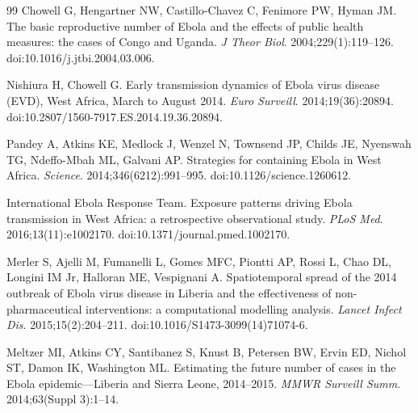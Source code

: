 \documentclass[10pt]{plos}
\begin{document}
\begin{thebibliography}{99}
 Chowell G, Hengartner NW, Castillo-Chavez C,
Fenimore PW, Hyman JM. The basic reproductive number of Ebola and the
effects of public health measures: the cases of Congo and Uganda.
\emph{J Theor Biol}. 2004;229(1):119--126. doi:10.1016/j.jtbi.2004.03.006.

 Nishiura H, Chowell G. Early transmission dynamics
of Ebola virus disease (EVD), West Africa, March to August 2014.
\emph{Euro Surveill}. 2014;19(36):20894.
doi:10.2807/1560-7917.ES.2014.19.36.20894.

 Pandey A, Atkins KE, Medlock J, Wenzel N, Townsend
JP, Childs JE, Nyenswah TG, Ndeffo-Mbah ML, Galvani AP. Strategies for
containing Ebola in West Africa. \emph{Science}. 2014;346(6212):991--995.
doi:10.1126/science.1260612.

 International Ebola Response Team. Exposure
patterns driving Ebola transmission in West Africa: a retrospective
observational study. \emph{PLoS Med}. 2016;13(11):e1002170.
doi:10.1371/journal.pmed.1002170.

 Merler S, Ajelli M, Fumanelli L, Gomes MFC, Piontti
AP, Rossi L, Chao DL, Longini IM Jr, Halloran ME, Vespignani A.
Spatiotemporal spread of the 2014 outbreak of Ebola virus disease in
Liberia and the effectiveness of non-pharmaceutical interventions: a
computational modelling analysis. \emph{Lancet Infect Dis}.
2015;15(2):204--211. doi:10.1016/S1473-3099(14)71074-6.

 Meltzer MI, Atkins CY, Santibanez S, Knust B,
Petersen BW, Ervin ED, Nichol ST, Damon IK, Washington ML. Estimating
the future number of cases in the Ebola epidemic---Liberia and Sierra
Leone, 2014--2015. \emph{MMWR Surveill Summ}. 2014;63(Suppl 3):1--14.

\end{thebibliography}
\end{document}
